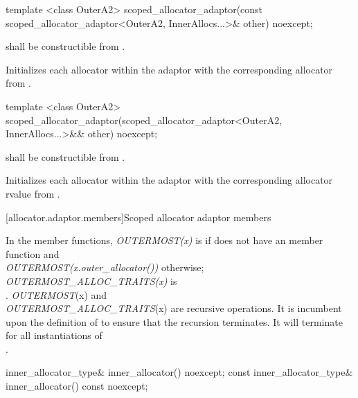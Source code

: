 %
\begin{itemdecl}
template <class OuterA2>
  scoped_allocator_adaptor(const scoped_allocator_adaptor<OuterA2,
                                                          InnerAllocs...>& other) noexcept;
\end{itemdecl}

\begin{itemdescr}
\pnum
\requires {} shall be constructible from .

\pnum
\effects Initializes each allocator within the adaptor with the corresponding allocator
from .
\end{itemdescr}

%
\begin{itemdecl}
template <class OuterA2>
  scoped_allocator_adaptor(scoped_allocator_adaptor<OuterA2,
                                                    InnerAllocs...>&& other) noexcept;
\end{itemdecl}

\begin{itemdescr}
\pnum
\requires {} shall be constructible from .

\pnum
\effects Initializes each allocator within the adaptor with the corresponding allocator rvalue
from .
\end{itemdescr}

[allocator.adaptor.members]{Scoped allocator adaptor members}

\pnum
In the  member functions,
\textit{OUTERMOST(x)} is  if  does not have an
 member function and \\
\textit{OUTERMOST(x.outer_allocator())}
otherwise;
\textit{OUTERMOST_ALLOC_TRAITS(x)} is \\
.
\enternote \textit{OUTERMOST}(x) and \\
\textit{OUTERMOST_ALLOC_TRAITS}(x) are recursive operations. It
is incumbent upon the definition of  to ensure that the
recursion terminates. It will terminate for all instantiations of \\
. \exitnote

%
%
\begin{itemdecl}
inner_allocator_type& inner_allocator() noexcept;
const inner_allocator_type& inner_allocator() const noexcept;
\end{itemdecl}

